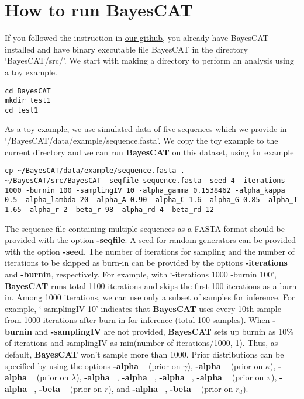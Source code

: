 \documentclass[11pt]{article}
\begin{document}
\section{How to run BayesCAT}
\label{sec-4}
If you followed the instruction in \href{https://github.com/heejungshim/BayesCAT}{our github}, you already have BayesCAT installed and have binary executable file BayesCAT in the directory `BayesCAT/src/'. We start with making a directory to perform an analysis using a toy example.
\begin{lstlisting}
cd BayesCAT
mkdir test1
cd test1
\end{lstlisting}
As a toy example, we use simulated data of five sequences which we provide in `/BayesCAT/data/example/sequence.fasta'. We copy the toy example to the current directory and we can run \textbf{BayesCAT} on this dataset, using for example 
\begin{lstlisting}
cp ~/BayesCAT/data/example/sequence.fasta .
~/BayesCAT/src/BayesCAT -seqfile sequence.fasta -seed 4 -iterations 1000 -burnin 100 -samplingIV 10 -alpha_gamma 0.1538462 -alpha_kappa 0.5 -alpha_lambda 20 -alpha_A 0.90 -alpha_C 1.6 -alpha_G 0.85 -alpha_T 1.65 -alpha_r 2 -beta_r 98 -alpha_rd 4 -beta_rd 12
\end{lstlisting}
The sequence file containing multiple sequences as a FASTA format should be provided with the option \textbf{-seqfile}. A seed for random generators can be provided with the option \textbf{-seed}. The number of iterations for sampling and the number of iterations to be skipped as burn-in can be provided by the options \textbf{-iterations} and \textbf{-burnin}, respectively. For example, with `-iterations 1000 -burnin 100', \textbf{BayesCAT} runs total 1100 iterations and skips the first 100 iterations as a burn-in. Among 1000 iterations, we can use only a subset of samples for inference. For example, `-samplingIV 10' indicates that \textbf{BayesCAT} uses every 10th sample from 1000 iterations after burn in for inference (total 100 samples). When \textbf{-burnin} and \textbf{-samplingIV} are not provided, \textbf{BayesCAT} sets up burnin as 10\% of iterations and samplingIV as min(number of iterations/1000, 1). Thus, as default, \textbf{BayesCAT} won't sample more than 1000. Prior distributions can be specified by using the options \textbf{-alpha_{}} (prior on $\gamma$), \textbf{-alpha_{}} (prior on $\kappa$), \textbf{-alpha_{}} (prior on $\lambda$), \textbf{-alpha_{}}, \textbf{-alpha_{}}, \textbf{-alpha_{}}, \textbf{-alpha_{}} (prior on $\pi$), \textbf{-alpha_{}}, \textbf{-beta_{}} (prior on $r$), and \textbf{-alpha_{}}, \textbf{-beta_{}} (prior on $r_d$). 
\end{document}
